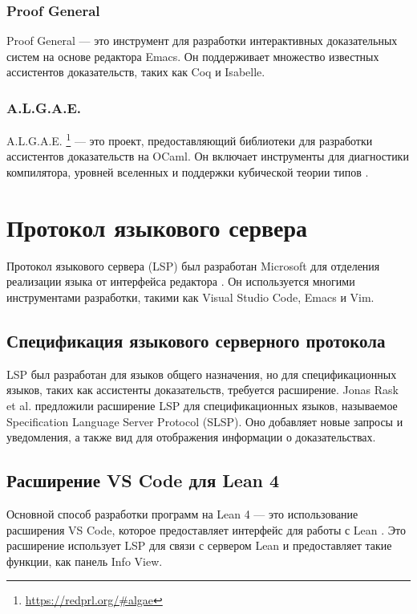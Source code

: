 \subsubsection{Proof General}

Proof General \cite{Aspinall2000} — это инструмент для разработки интерактивных доказательных систем на основе редактора Emacs. Он поддерживает множество известных ассистентов доказательств, таких как Coq и Isabelle.

\subsubsection{A.L.G.A.E.}

A.L.G.A.E. \footnote{\url{https://redprl.org/\#algae}} — это проект, предоставляющий библиотеки для разработки ассистентов доказательств на OCaml. Он включает инструменты для диагностики компилятора, уровней вселенных и поддержки кубической теории типов \cite{Kovacs2021}.

\section{Протокол языкового сервера}

Протокол языкового сервера (LSP) был разработан Microsoft для отделения реализации языка от интерфейса редактора \cite{Buender2019}. Он используется многими инструментами разработки, такими как Visual Studio Code, Emacs и Vim.

\subsection{Спецификация языкового серверного протокола}

LSP был разработан для языков общего назначения, но для спецификационных языков, таких как ассистенты доказательств, требуется расширение. Jonas Rask et al. \cite{JonasKjaerRask2021} предложили расширение LSP для спецификационных языков, называемое Specification Language Server Protocol (SLSP). Оно добавляет новые запросы и уведомления, а также вид для отображения информации о доказательствах.

\subsection{Расширение VS Code для Lean 4}

Основной способ разработки программ на Lean 4 — это использование расширения VS Code, которое предоставляет интерфейс для работы с Lean \cite{Nawrocki2023}. Это расширение использует LSP для связи с сервером Lean и предоставляет такие функции, как панель Info View.


